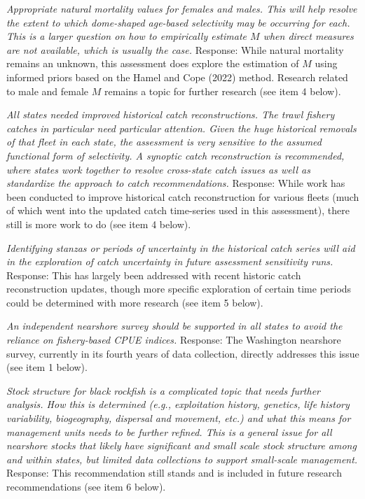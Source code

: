 \documentclass[11pt,
  english,
  letterpaper,
]{article}
\begin{document}
\textit{Appropriate natural mortality values for females and males. This will help resolve the extent to which dome-shaped age-based selectivity may be occurring for each. This is a larger question on how to empirically estimate $M$ when direct measures are not available, which is usually the case.} Response: While natural mortality remains an unknown, this assessment does explore the estimation of \(M\) using informed priors based on the Hamel and Cope (2022) method. Research related to male and female \(M\) remains a topic for further research (see item 4 below).

\textit{All states needed improved historical catch reconstructions. The trawl fishery catches in particular need particular attention. Given the huge historical removals of that fleet in each state, the assessment is very sensitive to the assumed functional form of selectivity. A synoptic catch reconstruction is recommended, where states work together to resolve cross-state catch issues as well as standardize the approach to catch recommendations.} Response: While work has been conducted to improve historical catch reconstruction for various fleets (much of which went into the updated catch time-series used in this assessment), there still is more work to do (see item 4 below).

\textit{Identifying stanzas or periods of uncertainty in the historical catch series will aid in the exploration of catch uncertainty in future assessment sensitivity runs.} Response: This has largely been addressed with recent historic catch reconstruction updates, though more specific exploration of certain time periods could be determined with more research (see item 5 below).

\textit{An independent nearshore survey should be supported in all states to avoid the reliance on fishery-based CPUE indices.} Response: The Washington nearshore survey, currently in its fourth years of data collection, directly addresses this issue (see item 1 below).

\textit{Stock structure for black rockfish is a complicated topic that needs further analysis. How this is determined (e.g., exploitation history, genetics, life history variability, biogeography, dispersal and movement, etc.) and what this means for management units needs to be further refined. This is a general issue for all nearshore stocks that likely have significant and small scale stock structure among and within states, but limited data collections to support small-scale management.} Response: This recommendation still stands and is included in future research recommendations (see item 6 below).
\end{document}
